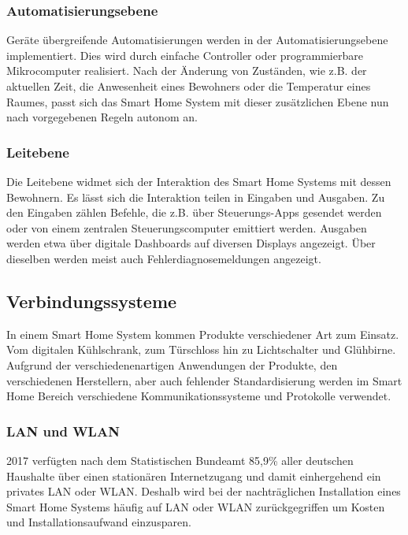 \subsubsection{Automatisierungsebene}

Geräte übergreifende Automatisierungen werden in der Automatisierungsebene implementiert.
Dies wird durch einfache Controller oder programmierbare Mikrocomputer realisiert.
Nach der Änderung von Zuständen, wie z.B. der aktuellen Zeit, die Anwesenheit eines Bewohners oder die Temperatur eines Raumes, passt sich das Smart Home System mit dieser zusätzlichen Ebene nun nach vorgegebenen Regeln autonom an.

\subsubsection{Leitebene}

Die Leitebene widmet sich der Interaktion des Smart Home Systems mit dessen Bewohnern.
Es lässt sich die Interaktion teilen in Eingaben und Ausgaben.
Zu den Eingaben zählen Befehle, die z.B. über Steuerungs-Apps gesendet werden oder von einem zentralen Steuerungscomputer emittiert werden.
Ausgaben werden etwa über digitale Dashboards auf diversen Displays angezeigt.
Über dieselben werden meist auch Fehlerdiagnosemeldungen angezeigt.


\subsection{Verbindungssysteme}

In einem Smart Home System kommen Produkte verschiedener Art zum Einsatz.
Vom digitalen Kühlschrank, zum Türschloss hin zu Lichtschalter und Glühbirne.
Aufgrund der verschiedenenartigen Anwendungen der Produkte, den verschiedenen Herstellern, aber auch fehlender Standardisierung werden im Smart Home Bereich verschiedene Kommunikationssysteme und Protokolle verwendet.

\subsubsection{LAN und WLAN}

2017 verfügten nach dem Statistischen Bundeamt 85,9\% aller deutschen Haushalte über einen stationären Internetzugang und damit einhergehend ein privates \ac{LAN} oder \ac{WLAN}.
Deshalb wird bei der nachträglichen Installation eines Smart Home Systems häufig auf \ac{LAN} oder \ac{WLAN} zurückgegriffen um Kosten und Installationsaufwand einzusparen.

